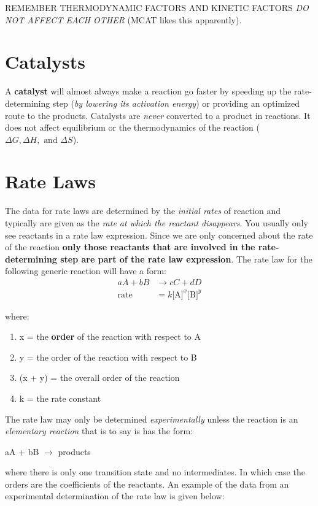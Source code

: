 \documentclass[../GChemReview.tex]{subfiles}
\begin{document}
	REMEMBER THERMODYNAMIC FACTORS AND KINETIC FACTORS \emph{DO NOT AFFECT EACH OTHER} (MCAT likes this apparently).
	
	\section{Catalysts}
	
	A \textbf{catalyst} will almost always make a reaction go faster by speeding up the rate-determining step (\emph{by lowering its activation energy}) or providing an optimized route to the products. Catalysts are \emph{never} converted to a product in reactions. It does not affect equilibrium or the thermodynamics of the reaction ($ \Delta G, \Delta H, \text{ and } \Delta S $).
	
	\section{Rate Laws}
	
	The data for rate laws are determined by the \emph{initial rates} of reaction and typically are given as the \emph{rate at which the reactant disappears}. You usually only see reactants in a rate law expression. Since we are only concerned about the rate of the reaction \textbf{only those reactants that are involved in the rate-determining step are part of the rate law expression}. The rate law for the following generic reaction will have a form:
	\begin{align*}
		aA + bB &\rightarrow cC + dD \\
		\text{rate} &= k\text{[A]}^{x}\text{[B]}^{y}
	\end{align*}
	
	where:
	\begin{enumerate}
		\item x = the \textbf{order} of the reaction with respect to A
		\item y = the order of the reaction with respect to B
		\item (x + y) = the overall order of the reaction
		\item k = the rate constant
	\end{enumerate}
	
	The rate law may only be determined \emph{experimentally} unless the reaction is an \emph{elementary reaction} that is to say is has the form:
	\begin{center}
		aA + bB $ \rightarrow $ products
	\end{center}
	where there is only one transition state and no intermediates. In which case the orders are the coefficients of the reactants. An example of the data from an experimental determination of the rate law is given below:
	
\end{document}
